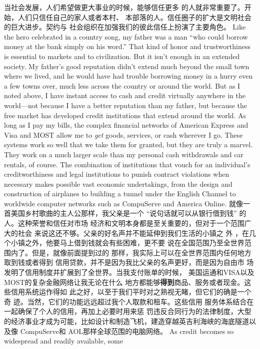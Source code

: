 \begin{paracol}{2}
\switchcolumn
当社会发展，人们希望做更大事业的时候，能够信任更多
的人就非常重要了。开始，人们只信任自己的家人或者本村、
本部落的人。信任圈子的扩大是文明社会的巨大进步。契约与
社会组织在加强我们的彼此信任上扮演了主要角色。
\switchcolumn*
Like the hero celebrated in a country song, my father was a
man ``who could borrow money at the bank simply on his
word.'' That kind of honor and trustworthiness is essential to
markets and to civilization. But it isn't enough in an extended society. My father's good reputation didn't extend much beyond the small town where we lived, and he would have had
trouble borrowing money in a hurry even a few towns over,
much less across the country or around the world. But as I
noted above, I have instant access to cash and credit virtually
anywhere in the world---not because I have a better reputation
than my father, but because the free market has developed
credit institutions that extend around the world. As long as I
pay my bills, the complex financial networks of American Express and Visa and MOST allow me to \textit{get} goods, services, or
cash wherever I go. These systems work so well that we take
them for granted, but they are truly a marvel. They work on a
much larger scale than my personal cash withdrawals and car
rentals, of course. The combination of institutions that vouch
for an individual's creditworthiness and legal institutions to
punish contract violations when necessary makes possible vast
economic undertakings, from the design and construction of
airplanes to building a tunnel under the English Channel to
worldwide computer networks such as CompuServe and America Online.
\switchcolumn
就像一首美国乡村歌曲的主人公那样，我父亲是一个
“说句话就可以从银行借到钱” 的人。这种荣誉和信任对市场
经济和文明本身都是至关重要的，但对于一个范围广大的社会
来说这还不够。父亲的好名声并不能延伸到我们生活的小镇之
外 ，在几个小镇之外，他要马上借到钱就会有些困难，更不要
说在全国范围乃至全世界范围内了。但是，就像前面提到过的
那样，我实际上可以在全世界范围内任何地方取到钱或者得到
信用贷款，并不是因为我比父亲的名声更好，而是因为自由市
场发明了信用制度并扩展到了全世界。当我支付账单的时候，
美国运通和VISA以及MOST的复杂金融网络让我无论在什么
地方都能够\textbf{得到}商品、服务或者现金。这些信用系统运作得如
此之好，以至于我们平时对之熟视无睹，但它们的确是一个奇
迹。当然，它们的功能远远超过我个人取款和租车。这些信用
服务体系结合在一起确保了个人的信用，再加上必要时用来惩
罚违反合同行为的法律制度，大型的经济事业才成为可能，比如设计和制造飞机，建造穿越英吉利海峡的海底隧道以及像
CompuServe和 AOL那样全球范围的电脑网络。
\switchcolumn*
As credit becomes so widespread and readily available, some

\end{paracol}
